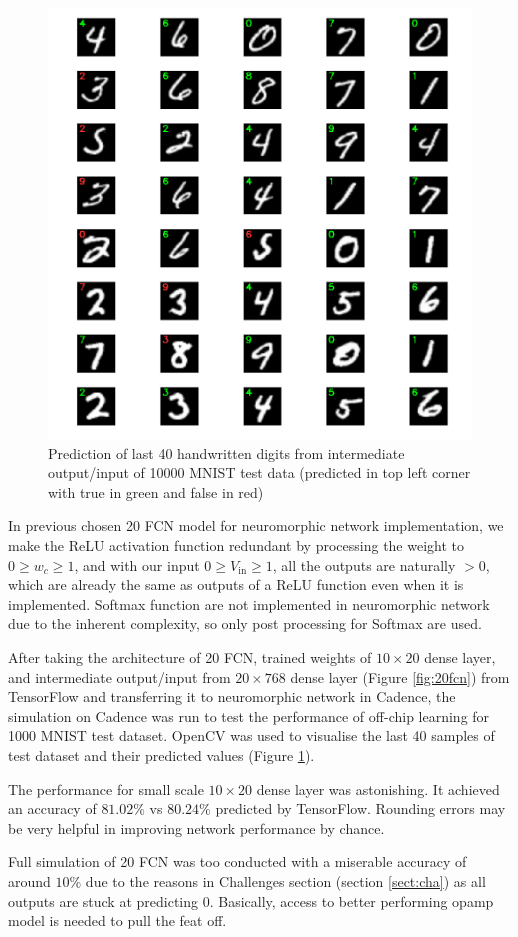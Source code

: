 \begin{figure}[H]
	\centering
	\includegraphics[scale=0.7]{predict.png}
	\caption{Prediction of last 40 handwritten digits from intermediate
		output/input
		of 10000 MNIST test data (predicted in top left corner with true in green and false in red)}
	\label{fig:predict}
\end{figure}
In previous chosen 20 FCN model for neuromorphic network implementation, we make the ReLU activation function redundant by processing the weight to $0 \geq w_c \geq 1$, and with our input $0 \geq V_{\text{in}} \geq 1$, all the outputs are naturally $>0$, which are already the same as outputs of a ReLU function even when it is implemented. Softmax function are not implemented in neuromorphic network due to the inherent complexity, so only post processing for Softmax are used.

After taking the architecture of 20 FCN, trained weights of $10\times 20$ dense layer, and intermediate output/input from $20\times 768$ dense layer (Figure \ref{fig:20fcn}) from TensorFlow and transferring it to neuromorphic network in Cadence, the simulation on Cadence was run to test the performance of off-chip learning for 1000 MNIST test dataset. OpenCV was used to visualise the last 40 samples of test dataset and their predicted values (Figure \ref{fig:predict}).

The performance for small scale $10\times 20$ dense layer was astonishing. It achieved an accuracy of $81.02\%$ vs $80.24\%$ predicted by TensorFlow. Rounding errors may be very helpful in improving network performance by chance.

Full simulation of 20 FCN was too conducted with a miserable accuracy of around $10\%$ due to the reasons in Challenges section (section \ref{sect:cha}) as all outputs are stuck at predicting 0. Basically, access to better performing opamp model is needed to pull the feat off.